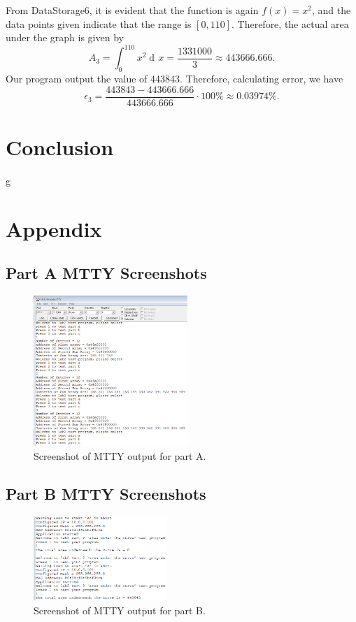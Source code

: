 \documentclass[10pt, letterpaper, titlepage]{article} %
\DeclareMathOperator{\di}{d\!} %
\begin{document}
\begin{multicols*}{2}
From DataStorage6, it is evident that the function is again $f(x) = x^2$, and the data points given indicate that the range is $[0, 110]$. Therefore, the actual area under the graph is given by
\begin{equation}
	A_3 = \int_0^{110} x^2 \di x = \dfrac{1331000}{3} \approx 443666.666.
\end{equation} 
Our program output the value of 443843. Therefore, calculating error, we have
\begin{equation}
	\epsilon_3 = \dfrac{443843 - 443666.666}{443666.666} \cdot 100\% \approx 0.03974\%. 
\end{equation}

\section{Conclusion}
g


\end{multicols*}

\newpage

\section{Appendix}
\subsection{Part A MTTY Screenshots}
\begin{figure}[H]
   \includegraphics[width=0.52\textwidth]{mttypartA.png}
   \centering  
   \caption{Screenshot of MTTY output for part A.} 
   \label{figure:4}
\end{figure}

\subsection{Part B MTTY Screenshots}
\begin{figure}[H]
   \includegraphics[width=0.45\textwidth]{mttypartB.png}
   \centering  
   \caption{Screenshot of MTTY output for part B.} 
   \label{figure:5}
\end{figure}
\end{document}
